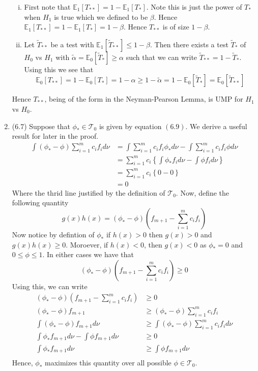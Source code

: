 \documentclass[12pt]{article}  %
\newcommand{\E}{{\mathbb{E}}}
\begin{document}
\begin{enumerate}
\begin{enumerate}[(i)]
\item First note that $\E_1[T_{**}] = 1-\E_1[T_{*}]$. Note this is just the power of $T_*$ when $H_1$ is true which we defined to be $\beta$. Hence  $\E_1[T_{**}] = 1-\E_1[T_{*}] = 1-\beta$. Hence $T_{**}$ is of size $1-\beta$.
\item Let $\tilde{T}_{**}$ be a test with $\E_1[\tilde{T}_{**}]\leq 1 - \beta$. Then there exists a test $\tilde{T}_{*}$ of $H_0$ vs $H_1$ with $\tilde{\alpha} = \E_0[\tilde{T}_{*}]\geq \alpha$ such that we can write $\tilde{T}_{**} = 1- \tilde{T}_{*}$.  Using this we see that $$\E_0[T_{**}] = 1 - \E_0[T_*] = 1 - \alpha \geq 1 - \tilde{\alpha} = 1 - \E_0[\tilde{T}_{*}] = \E_0[\tilde{T}_{**}]$$ 
\end{enumerate}
Hence $T_{**}$, being of the form in the Neyman-Pearson Lemma, is UMP for $H_1$ vs $H_0$. 
\item (6.7) Suppose that $\phi_*\in\mathcal{T}_0$ is given by equation $(6.9)$. We derive a useful result for later in the proof. 
\begin{align*}
\int(\phi_* - \phi)\sum_{i=1}^mc_if_id\nu&= \int\sum_{i=1}^{m}c_if_i\phi_*d\nu - \int\sum_{i=1}^{m}c_if_i\phi d\nu\\
&= \sum_{i=1}^mc_i\left\{\int \phi_*f_id\nu - \int\phi f_id\nu\right\}\\
&=\sum_{i=1}^mc_i \left\{0-0\right\}\\
&= 0
\end{align*}
Where the thrid line justified by the definition of $\mathcal{T}_0$. Now, define the following quantity 
$$g(x)h(x) = (\phi_* - \phi)(f_{m+1} - \sum_{i=1}^m c_if_i)$$ Now notice by defintion of $\phi_*$ if $h(x)>0$ then $g(x)>0$ and $g(x)h(x)\geq 0$. Moroever, if $h(x)<0$, then $g(x)<0$ as $\phi_* = 0$ and $0\leq\phi\leq 1$. In either cases we have that $$(\phi_* - \phi)(f_{m+1} - \sum_{i=1}^m c_if_i)\geq 0$$ Using this, we can write 
\begin{align*}
(\phi_* - \phi)(f_{m+1} - \sum_{i=1}^m c_if_i)&\geq 0\\
(\phi_* - \phi)f_{m+1}&\geq (\phi_* - \phi)\sum_{i=1}^m c_if_i\\
\int (\phi_* - \phi)f_{m+1}d\nu&\geq \int(\phi_* - \phi)\sum_{i=1}^m c_if_id\nu\\
\int \phi_*f_{m+1}d\nu - \int \phi f_{m+1}d\nu&\geq 0\\
\int \phi_*f_{m+1}d\nu  &\geq \int \phi f_{m+1}d\nu\\
\end{align*}
Hence, $\phi_*$ maximizes this quantity over all possible $\phi\in\mathcal{T}_0$.


\end{enumerate}
\end{document}
